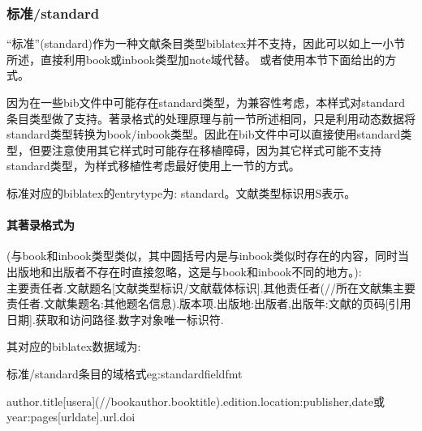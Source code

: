 
\subsubsection{标准/standard}\label{sec:standard}
“标准”(standard)作为一种文献条目类型biblatex并不支持，因此可以如上一小节所述，直接利用book或inbook类型加note域代替。
或者使用本节下面给出的方式。

因为在一些bib文件中可能存在standard类型，为兼容性考虑，本样式对standard条目类型做了支持。著录格式的处理原理与前一节所述相同，只是利用动态数据将standard类型转换为book/inbook类型。因此在bib文件中可以直接使用standard类型，但要注意使用其它样式时可能存在移植障碍，因为其它样式可能不支持standard类型，为样式移植性考虑最好使用上一节的方式。

\begin{refentry}{}{}
标准对应的biblatex的entrytype为: standard。文献类型标识用S表示。

\paragraph{其著录格式为}(与book和inbook类型类似，其中圆括号内是与inbook类似时存在的内容，同时当出版地和出版者不存在时直接忽略，这是与book和inbook不同的地方。):\\
主要责任者.文献题名[文献类型标识/文献载体标识].其他责任者(//所在文献集主要责任者.文献集题名:其他题名信息).版本项.出版地:出版者,出版年:文献的页码[引用日期].获取和访问路径.数字对象唯一标识符.
\end{refentry}

其对应的biblatex数据域为:
\begin{example}{标准/standard条目的域格式}{eg:standardfieldfmt}
\begin{texlist}
author.title[usera](//bookauthor.booktitle).edition.location:publisher,date或year:pages[urldate].url.doi
\end{texlist}
\end{example}


